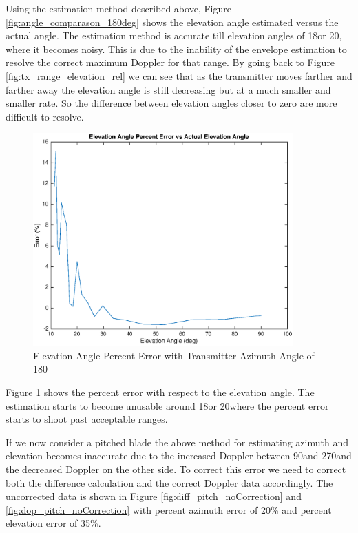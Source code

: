 Using the estimation method described above, Figure \ref{fig:angle_comparason_180deg} shows the elevation angle estimated versus the actual angle. The estimation method is accurate till elevation angles of 18\textdegree \space or 20\textdegree, where it becomes noisy. This is due to the inability of the envelope estimation to resolve the correct maximum Doppler for that range. By going back to Figure \ref{fig:tx_range_elevation_rel} we can see that as the transmitter moves farther and farther away the elevation angle is still decreasing but at a much smaller and smaller rate. So the difference between elevation angles closer to zero are more difficult to resolve. 

\begin{figure}
	\begin{center}
		\includegraphics[width=10cm]{images/results/Elevation_angle_percent_error_180deg_Azimuth.eps}
		\caption{Elevation Angle Percent Error with Transmitter Azimuth Angle of 180\textdegree}
		\label{fig:percent_error_elevation_180deg}
	\end{center}
\end{figure}

Figure \ref{fig:percent_error_elevation_180deg} shows the percent error with respect to the elevation angle. The estimation starts to become unusable around 18\textdegree \space or 20\textdegree \space where the percent error starts to shoot past acceptable ranges.


If we now consider a pitched blade the above method for estimating azimuth and elevation becomes inaccurate due to the increased Doppler between 90\textdegree \space and 270\textdegree \space and the decreased Doppler on the other side. To correct this error we need to correct both the difference calculation and the correct Doppler data accordingly. The uncorrected data is shown in Figure \ref{fig:diff_pitch_noCorrection} and \ref{fig:dop_pitch_noCorrection} with percent azimuth error of 20\% and percent elevation error of 35\%.

